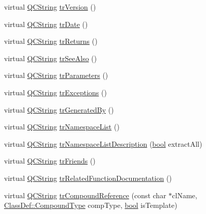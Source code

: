 \begin{DoxyCompactItemize}
\item 
virtual \hyperlink{class_q_c_string}{Q\+C\+String} \hyperlink{class_translator_serbian_cyrillic_aa3ae9ebbab55efd83812aeae18c8b638}{tr\+Version} ()
\item 
virtual \hyperlink{class_q_c_string}{Q\+C\+String} \hyperlink{class_translator_serbian_cyrillic_a5951566c2f2e5897d69fdf5681ce1b62}{tr\+Date} ()
\item 
virtual \hyperlink{class_q_c_string}{Q\+C\+String} \hyperlink{class_translator_serbian_cyrillic_a29bfc5b39fe4da0d7a649acc2b74c130}{tr\+Returns} ()
\item 
virtual \hyperlink{class_q_c_string}{Q\+C\+String} \hyperlink{class_translator_serbian_cyrillic_a8210c715c99c3d7292ac0912ffa988f2}{tr\+See\+Also} ()
\item 
virtual \hyperlink{class_q_c_string}{Q\+C\+String} \hyperlink{class_translator_serbian_cyrillic_ae37b55a1c3fa055d42891c5ccc4b37c9}{tr\+Parameters} ()
\item 
virtual \hyperlink{class_q_c_string}{Q\+C\+String} \hyperlink{class_translator_serbian_cyrillic_aa2bfbaae043f9a0f8473ffba434812b6}{tr\+Exceptions} ()
\item 
virtual \hyperlink{class_q_c_string}{Q\+C\+String} \hyperlink{class_translator_serbian_cyrillic_a52e7248dac2ad31ca3f5bb4808ea6fdc}{tr\+Generated\+By} ()
\item 
virtual \hyperlink{class_q_c_string}{Q\+C\+String} \hyperlink{class_translator_serbian_cyrillic_a8e32fd986cedd63eb19cffc905019d31}{tr\+Namespace\+List} ()
\item 
virtual \hyperlink{class_q_c_string}{Q\+C\+String} \hyperlink{class_translator_serbian_cyrillic_a572d5bad2f4a6a6fb957a32564df04b3}{tr\+Namespace\+List\+Description} (\hyperlink{qglobal_8h_a1062901a7428fdd9c7f180f5e01ea056}{bool} extract\+All)
\item 
virtual \hyperlink{class_q_c_string}{Q\+C\+String} \hyperlink{class_translator_serbian_cyrillic_a4347ef3d65f6e7b2bd85a6ca83d40ebb}{tr\+Friends} ()
\item 
virtual \hyperlink{class_q_c_string}{Q\+C\+String} \hyperlink{class_translator_serbian_cyrillic_a2e3d8cfd9d451d1bd0a7ee449aadbf2f}{tr\+Related\+Function\+Documentation} ()
\item 
virtual \hyperlink{class_q_c_string}{Q\+C\+String} \hyperlink{class_translator_serbian_cyrillic_a798d2b6dc09bed21a980947f3fc5676a}{tr\+Compound\+Reference} (const char $\ast$cl\+Name, \hyperlink{class_class_def_ae70cf86d35fe954a94c566fbcfc87939}{Class\+Def\+::\+Compound\+Type} comp\+Type, \hyperlink{qglobal_8h_a1062901a7428fdd9c7f180f5e01ea056}{bool} is\+Template)

\end{DoxyCompactItemize}
